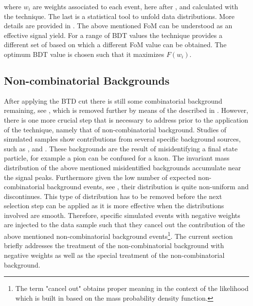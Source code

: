 \noindent where $w_i$ are weights associated to each event, here after \sWeights, and calculated with the
\sPlot technique. The last  is a statistical tool to unfold data distributions\cite{splot}. More details are provided
in . The above mentioned FoM can be understood as an effective signal yield.
For a range of BDT values the \sPlot technique provides a different set of \sWeights based on which a different
FoM value can be obtained. The optimum BDT value is chosen such that it maximizes $F(w_i)$.

\subsection{Non-combinatorial Backgrounds}
\label{peaking_backgrounds}

After applying the BTD cut there is still some combinatorial background remaining, see , which is removed
further by means of the \sWeights described in . However, there is
one more crucial step that is necessary to address prior to the application of the \sPlot technique,
namely that of non-combinatorial background. Studies of simulated samples show contributions from
several specific background sources, such as \BsJpsiKK, \BsJpsipipi and \BdJpsipipi.
These backgrounds are the result of misidentifying a final state particle, for example a pion can
be confused for a kaon. The invariant mass distribution of the above mentioned misidentified backgrounds
accumulate near the \BJpsiKpi signal peaks. Furthermore given the low number of expected non-combinatorial background events,
see , their distribution is quite non-uniform and discontinues.
This type of distribution has to be removed before the next selection step can be applied as it is more effective
when the distributions involved are smooth. Therefore, specific simulated events with negative weights
are injected to the data sample such that they cancel out the contribution of the above mentioned non-combinatorial background
events\footnote{The term "cancel out" obtains proper meaning in the context of the likelihood which is built
in  based on the mass probability density function.}.
The current section briefly addresses the treatment of the non-combinatorial background with negative weights
as well as the special treatment of the \LbJpsippi non-combinatorial background.

